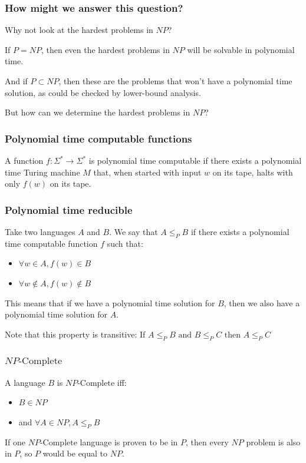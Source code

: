 \documentclass[aspectratio=169]{beamer}
\begin{document}
\begin{frame}
\frametitle{How might we answer this question?}

Why not look at the hardest problems in $NP$?

If $P = NP$, then even the hardest problems in $NP$ will be solvable in polynomial time.

And if $P \subset NP$, then these are the problems that won't have a polynomial time solution, as could be checked by lower-bound analysis.

But how can we determine the hardest problems in $NP$?
\end{frame}

\begin{frame}
\frametitle{Polynomial time computable functions}

A function $f:\Sigma^* \to \Sigma^*$ is polynomial time computable if there exists a polynomial time Turing machine $M$ that, when started with input $w$ on its tape, halts with only $f(w)$ on its tape.

\end{frame}

\begin{frame}
\frametitle{Polynomial time reducible}

Take two languages $A$ and $B$. We say that $A \leq_P B$ if there exists a polynomial time computable function $f$ such that:

\begin{itemize}
    \item $\forall w \in A, f(w) \in B$
    \item $\forall w \notin A, f(w) \notin B$
\end{itemize}

This means that if we have a polynomial time solution for $B$, then we also have a polynomial time solution for $A$.

Note that this property is transitive: If $A \leq_P B \text{ and } B \leq_P C \text{ then } A \leq_P C$

\end{frame}

\begin{frame}
\frametitle{$NP\text{-Complete}$}

A language $B$ is $NP\text{-Complete}$ iff:

\begin{itemize}
    \item $B \in NP$
    \item and $\forall A \in NP, A \leq_P B$
\end{itemize}

If one $NP\text{-Complete}$ language is proven to be in $P$, then every $NP$ problem is also in $P$, so $P$ would be equal to $NP$.
\end{frame}
\end{document}
